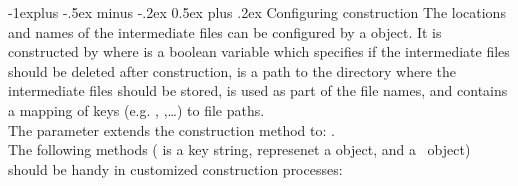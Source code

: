 \documentclass[10pt,landscape]{article}
\makeatletter
\renewcommand{\subsection}{\@startsection{subsection}{2}{0mm}%
                                {-1explus -.5ex minus -.2ex}%
                                {0.5ex plus .2ex}%
                                {\normalfont\normalsize\bfseries}}
\makeatother
\begin{document}
\begin{multicols}{3}
\subsection{Configuring construction}
The locations and names of the intermediate files
can be configured by a  object.
It is constructed by 
where
 is a boolean variable which specifies
if the intermediate files should be deleted after construction,
 is a path to the directory where
the intermediate files should be stored,
 is used as part of the file names,
and  contains a mapping of keys
(e.g. \href{\sdslgitinc/config.hpp}{}, 
      \href{\sdslgitinc/config.hpp}{},\ldots)
to file paths.\\
The  parameter extends the construction method to:
.\\
The following methods ( is a key string,  represenet a  
 object, and  a \sdsl\ object) should be handy
in customized construction processes:\\
\\
\\
\\
\\
\\


\end{multicols}
\end{document}
